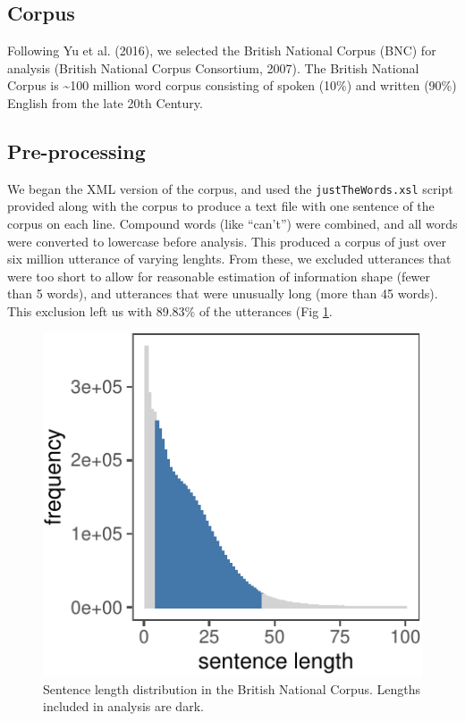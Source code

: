 \documentclass[10pt, letterpaper]{article}
\newenvironment{CodeChunk}{}{}
\begin{document}
\hypertarget{corpus}{%
\subsection{Corpus}\label{corpus}}

Following Yu et al. (2016), we selected the British National Corpus
(BNC) for analysis (British National Corpus Consortium, 2007). The
British National Corpus is \textasciitilde{}100 million word corpus
consisting of spoken (10\%) and written (90\%) English from the late
20th Century.

\hypertarget{pre-processing}{%
\subsection{Pre-processing}\label{pre-processing}}

We began the XML version of the corpus, and used the
\texttt{justTheWords.xsl} script provided along with the corpus to
produce a text file with one sentence of the corpus on each line.
Compound words (like ``can't'') were combined, and all words were
converted to lowercase before analysis. This produced a corpus of just
over six million utterance of varying lenghts. From these, we excluded
utterances that were too short to allow for reasonable estimation of
information shape (fewer than 5 words), and utterances that were
unusually long (more than 45 words). This exclusion left us with 89.83\%
of the utterances (Fig \ref{fig:bnc-lengths}.

\begin{CodeChunk}
\begin{figure}[tb]
\includegraphics{figs/bnc-lengths-1} \caption[Sentence length distribution in the British National Corpus]{Sentence length distribution in the British National Corpus. Lengths included in analysis are dark.}\label{fig:bnc-lengths}
\end{figure}
\end{CodeChunk}
\end{document}
